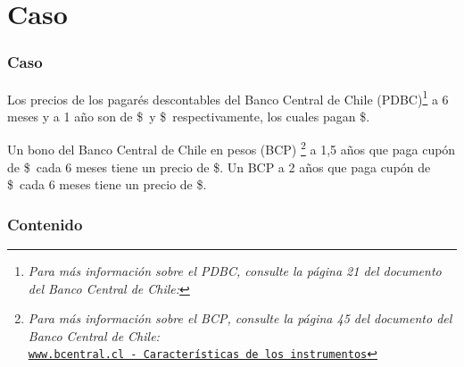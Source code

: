 \documentclass{beamer}
\begin{document}
\section{Caso}
  \begin{frame}
    
  \frametitle{Caso}

  Los precios de los pagarés descontables del Banco Central de Chile (PDBC)\footnote{\textit{Para 
  más información sobre el PDBC, consulte la página 21 del documento del Banco Central de Chile:}}
  a 6 meses y a 1 año son de \$\Fseis\ y \$\Funo\, respectivamente, los cuales pagan \$\Nominal.
  \vspace{0.5em}
  
  
  Un bono del Banco Central de Chile en pesos (BCP) \footnote{\textit{Para más información sobre el BCP, 
  consulte la página 45 del documento del Banco Central de Chile:}\\
  \tiny{\href{https://www.bcentral.cl/contenido/-/detalle/caracteristicas-de-los-instrumentos-del-mercado-financiero-nacional-3}
  {\texttt{www.bcentral.cl - Características de los instrumentos}}}}
  a 1,5 años que paga cupón de  \$\CunoCinco\  cada 6 meses tiene un precio de \$\PunoCinco. 
  Un BCP a 2 años que paga
  cupón de \$\Cdos\ cada 6 meses tiene un precio de \$\Pdos.

  \end{frame}
\begin{frame}
    \frametitle{Contenido}
    \tableofcontents
\end{frame}

\end{document}
